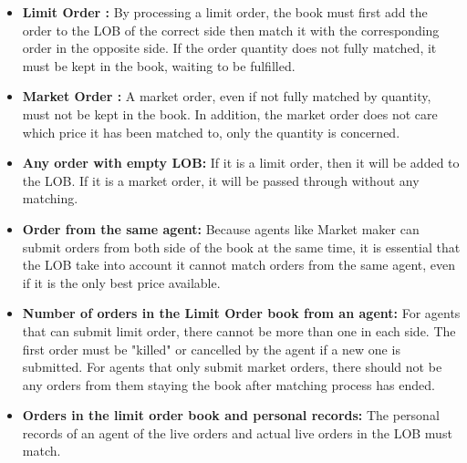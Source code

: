 \begin{itemize}
    \item \textbf{Limit Order : }By processing a limit order, the book must first add the order to the LOB of the correct side then match it with the corresponding order in the opposite side. If the order quantity does not fully matched, it must be kept in the book, waiting to be fulfilled.  
    
    \item \textbf{Market Order : }A market order, even if not fully matched by quantity, must not be kept in the book. In addition, the market order does not care which price it has been matched to, only the quantity is concerned. 
    
    \item \textbf{Any order with empty LOB: } If it is a limit order, then it will be added to the LOB. If it is a market order, it will be passed through without any matching.
     
    \item \textbf{Order from the same agent: } Because agents like Market maker can submit orders from both side of the book at the same time, it is essential that the LOB take into account it cannot match orders from the same agent, even if it is the only best price available. 
    
    \item \textbf{Number of orders in the Limit Order book from an agent: } For agents that can submit limit order, there cannot be more than one in each side. The first order must be "killed" or cancelled by the agent if a new one is submitted. For agents that only submit market orders, there should not be any orders from them staying the book after matching process has ended. 
    
    \item \textbf{Orders in the limit order book and personal records: } The personal records of an agent of the live orders and actual live orders in the LOB must match. 
     
\end{itemize} 
